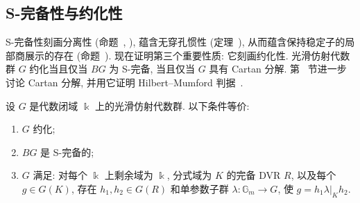 \subsection{S-完备性与约化性}\label{src:7.10.6-subsection}
S-完备性刻画分离性 (命题~, ), 蕴含无穿孔惯性 (定理~), 从而蕴含保持稳定子的局部商展示的存在 (命题~). 现在证明第三个重要性质: 它刻画约化性. 光滑仿射代数群 $G$ 约化当且仅当 $BG$ 为 S-完备, 当且仅当 $G$ 具有 Cartan 分解. 第~ 节进一步讨论 Cartan 分解, 并用它证明 Hilbert--Mumford 判据~.
\begin{proposition}\label{src:7.10.30}
设 $G$ 是代数闭域 $\Bbbk$ 上的光滑仿射代数群. 以下条件等价:
\begin{enumerate}[(1)]
\item $G$ 约化;
\item $BG$ 是 S-完备的;
\item $G$ 满足: 对每个 $\Bbbk$ 上剩余域为 $\Bbbk$, 分式域为 $K$ 的完备 DVR $R$, 以及每个 $g\in G(K)$, 存在 $h_1,h_2\in G(R)$ 和单参数子群 $\lambda:\mathbb G_m\to G$, 使 $g=h_1\lambda|_Kh_2$.
\end{enumerate}
\end{proposition}
